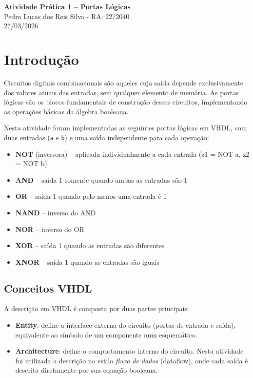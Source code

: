 \documentclass[12pt,a4paper, brazil]{article}
\begin{document}
\begin{center}
{\textbf {\huge Atividade Prática 1 -- Portas Lógicas}}\\[5mm]
{\large Pedro Lucas dos Reis Silva - RA: 2272040} \\[5mm]
27/03/2026\\[5mm]
\end{center}

\section{Introdução}

Circuitos digitais combinacionais são aqueles cuja saída depende exclusivamente dos valores atuais das entradas, sem qualquer elemento de memória. As portas lógicas são os blocos fundamentais de construção desses circuitos, implementando as operações básicas da álgebra booleana.

Nesta atividade foram implementadas as seguintes portas lógicas em VHDL, com duas entradas (\texttt{a} e \texttt{b}) e uma saída independente para cada operação:

\begin{itemize}
    \item \textbf{NOT} (inversora) -- aplicada individualmente a cada entrada (z1 = NOT a, z2 = NOT b)
    \item \textbf{AND} -- saída 1 somente quando ambas as entradas são 1
    \item \textbf{OR} -- saída 1 quando pelo menos uma entrada é 1
    \item \textbf{NAND} -- inverso do AND
    \item \textbf{NOR} -- inverso do OR
    \item \textbf{XOR} -- saída 1 quando as entradas são diferentes
    \item \textbf{XNOR} -- saída 1 quando as entradas são iguais
\end{itemize}

\subsection{Conceitos VHDL}

A descrição em VHDL é composta por duas partes principais:

\begin{itemize}
    \item \textbf{Entity}: define a interface externa do circuito (portas de entrada e saída), equivalente ao símbolo de um componente num esquemático.
    \item \textbf{Architecture}: define o comportamento interno do circuito. Nesta atividade foi utilizada a descrição no estilo \textit{fluxo de dados} (dataflow), onde cada saída é descrita diretamente por sua equação booleana.
\end{itemize}
\end{document}
